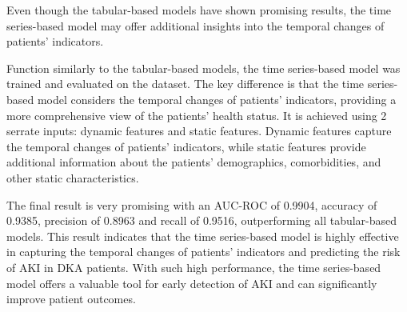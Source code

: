 \documentclass[../main.tex]{subfiles}
\begin{document}
Even though the tabular-based models have shown promising results, the time series-based model may offer additional insights into the temporal changes of patients' indicators.

Function similarly to the tabular-based models, the time series-based model was trained and evaluated on the dataset.
The key difference is that the time series-based model considers the temporal changes of patients' indicators, providing a more comprehensive view of the patients' health status.
It is achieved using 2 serrate inputs: dynamic features and static features.
Dynamic features capture the temporal changes of patients' indicators, while static features provide additional information about the patients' demographics, comorbidities, and other static characteristics.

The final result is very promising with an AUC-ROC of 0.9904, accuracy of 0.9385, precision of 0.8963 and recall of 0.9516, outperforming all tabular-based models.
This result indicates that the time series-based model is highly effective in capturing the temporal changes of patients' indicators and predicting the risk of AKI in DKA patients.
With such high performance, the time series-based model offers a valuable tool for early detection of AKI and can significantly improve patient outcomes.
\end{document}
